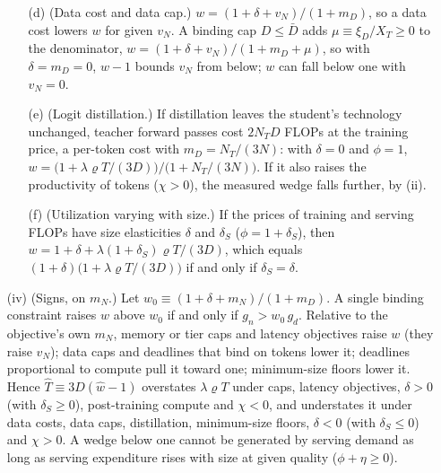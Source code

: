 \begin{proposition}
\begin{enumerate}
\begin{enumerate}
\item[(d)] (Data cost and data cap.) $w=(1+\delta+v_N)/(1+m_D)$, so a data cost lowers $w$ for given $v_N$. A binding cap
$D\le\bar D$ adds $\mu\equiv\xi_D/X_T\ge0$ to the denominator, $w=(1+\delta+v_N)/(1+m_D+\mu)$, so with $\delta=m_D=0$,
$w-1$ bounds $v_N$ from below; $w$ can fall below one with $v_N=0$.
\item[(e)] (Logit distillation.) If distillation leaves the student's technology unchanged, teacher forward passes cost
$2N_TD$ FLOPs at the training price, a per-token cost with $m_D=N_T/(3N)$: with $\delta=0$ and $\phi=1$,
$w=\big(1+\lambda\varrho T/(3D)\big)/\big(1+N_T/(3N)\big)$. If it also raises the productivity of tokens ($\chi>0$), the
measured wedge falls further, by (ii).
\item[(f)] (Utilization varying with size.) If the prices of training and serving FLOPs have size elasticities $\delta$
and $\delta_S$ ($\phi=1+\delta_S$), then $w=1+\delta+\lambda(1+\delta_S)\varrho T/(3D)$, which equals
$(1+\delta)\big(1+\lambda\varrho T/(3D)\big)$ if and only if $\delta_S=\delta$.
\end{enumerate}
\item[(iv)] (Signs, on $m_N$.) Let $w_0\equiv(1+\delta+m_N)/(1+m_D)$. A single binding constraint raises $w$ above $w_0$
if and only if $g_n>w_0\,g_d$. Relative to the objective's own $m_N$, memory or tier caps and latency objectives raise
$w$ (they raise $v_N$); data caps and deadlines that bind on tokens lower it; deadlines proportional to compute pull it
toward one; minimum-size floors lower it. Hence $\hat T\equiv3D(\hat w-1)$ overstates $\lambda\varrho T$ under caps,
latency objectives, $\delta>0$ (with $\delta_S\ge0$), post-training compute and $\chi<0$, and understates it under data
costs, data caps, distillation, minimum-size floors, $\delta<0$ (with $\delta_S\le0$) and $\chi>0$. A wedge below one
cannot be generated by serving demand as long as serving expenditure rises with size at given quality ($\phi+\eta\ge0$).
\end{enumerate}
\end{proposition}

